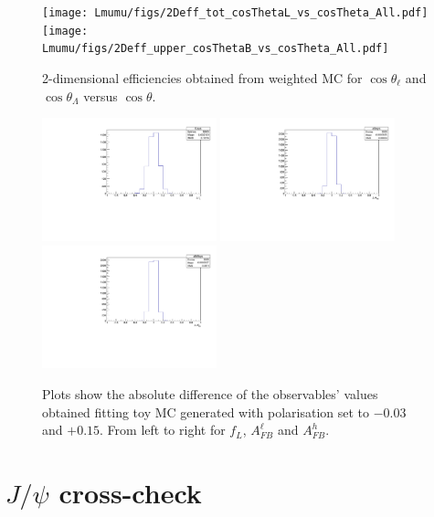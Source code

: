 \begin{figure}
\centering
\texttt{[image: Lmumu/figs/2Deff\_tot\_cosThetaL\_vs\_cosTheta\_All.pdf]}
\texttt{[image: Lmumu/figs/2Deff\_upper\_cosThetaB\_vs\_cosTheta\_All.pdf]}
\caption{2-dimensional efficiencies obtained from weighted MC for $\cos \theta_\ell$ and $\cos\theta_\Lambda$ versus $\cos\theta$.}
\label{fig:2Deffs}
\end{figure}
\begin{figure}
\centering
\includegraphics[width=0.45\textwidth]{Lmumu/figs/fLsys_polarisation.pdf}
\includegraphics[width=0.45\textwidth]{Lmumu/figs/afbsys_polarisation.pdf}
\includegraphics[width=0.45\textwidth]{Lmumu/figs/afbBsys_polarisation.pdf}
\caption{Plots show the absolute difference of the observables' values obtained fitting toy MC generated with polarisation set to $-0.03$ and $+0.15$. From left to right for $f_L$, $A_{FB}^\ell$ and $A_{FB}^h$. }
\label{fig:Afbpolsys}
\end{figure}




\section{$J/\psi$ cross-check}

